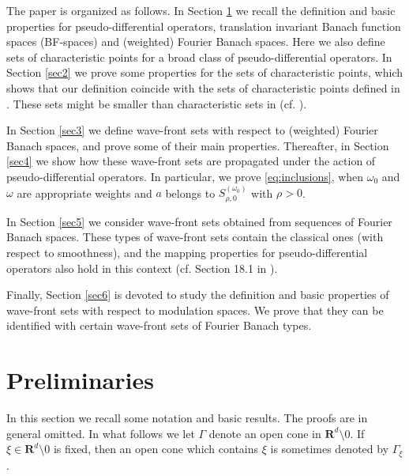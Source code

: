 \documentclass[12pt,a4paper,reqno]{amsart}
\numberwithin{equation}{section}
\numberwithin{thm}{section}
\theoremstyle{definition}
\theoremstyle{remark}
\begin{document}
\medspace

The paper is organized as follows. In Section
\ref{sec1} we recall the definition and basic properties for
pseudo-differential operators, translation invariant Banach function
spaces (BF-spaces) and (weighted) Fourier Banach
spaces. Here we also define sets of characteristic points for a broad
class of pseudo-differential operators.
In Section \ref{sec2} we prove some properties for the sets of
characteristic points, which shows that our definition coincide with
the sets of characteristic points defined in \cite{PTT1}. These sets
might be smaller than characteristic sets in
\cite{Ho1} (cf. \cite[Example 3.11]{PTT1}).

\par 

In Section \ref{sec3} we define wave-front sets with respect to
(weighted) Fourier Banach spaces, and prove some of their
main properties. Thereafter, in Section \ref{sec4} we
show how these wave-front sets are propagated under the action
of pseudo-differential operators. In particular, we prove \eqref{eq:inclusions},
when $\omega _0$ and $\omega$ are appropriate weights and
$a$ belongs to $S^{(\omega _0)}_{\rho ,0}$ with
$\rho >0$.

\par

In Section \ref{sec5} we consider wave-front sets obtained from
sequences of Fourier Banach spaces. These types of wave-front sets
contain the classical ones (with respect to smoothness), and the mapping
properties for pseudo-differential operators also hold in this context
(cf. Section 18.1 in \cite{Ho1}).

\par

Finally, Section \ref{sec6} is devoted to study the definition and basic properties of
wave-front sets with respect to modulation spaces. We prove that they can be identified with certain
wave-front sets of Fourier Banach types.

\par

\section{Preliminaries}\label{sec1}

\par

In this section we recall some notation and basic results. The proofs
are in general omitted. In what
follows we let $\Gamma$ denote an open cone in ${\mathbf R^{d}}{\setminus 0}$. If
$\xi \in {\mathbf R^{d}}{\setminus 0}$ is fixed, then an open cone which contains
$\xi $ is sometimes denoted by $\Gamma_\xi$.
\end{document}

